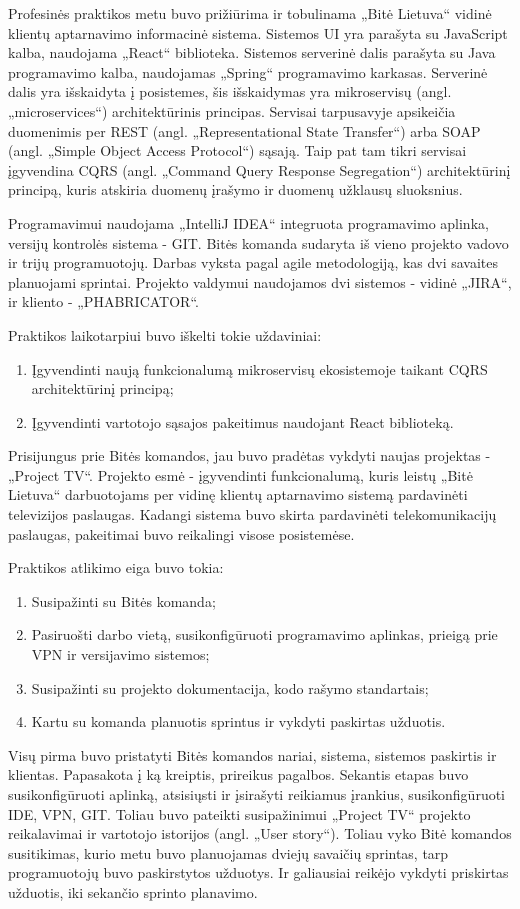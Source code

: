 Profesinės praktikos metu buvo prižiūrima ir tobulinama „Bitė Lietuva“ vidinė klientų aptarnavimo informacinė sistema. Sistemos UI yra parašyta su JavaScript kalba,
naudojama „React“ biblioteka. Sistemos serverinė dalis parašyta su Java programavimo kalba, naudojamas „Spring“ programavimo karkasas. Serverinė dalis yra išskaidyta į
posistemes, šis išskaidymas yra mikroservisų (angl. „microservices“) architektūrinis principas. Servisai tarpusavyje apsikeičia duomenimis per
REST (angl. „Representational State Transfer“) arba SOAP (angl. „Simple Object Access Protocol“) sąsają. Taip pat tam tikri servisai įgyvendina
CQRS (angl. „Command Query Response Segregation“) architektūrinį principą, kuris atskiria duomenų įrašymo ir duomenų užklausų sluoksnius.

Programavimui naudojama „IntelliJ IDEA“ integruota programavimo aplinka, versijų kontrolės sistema - GIT. Bitės komanda sudaryta iš vieno projekto vadovo ir trijų programuotojų.
Darbas vyksta pagal agile metodologiją, kas dvi savaites planuojami sprintai. Projekto valdymui naudojamos dvi sistemos - vidinė „JIRA“, ir kliento - „PHABRICATOR“.

\smallskip
Praktikos laikotarpiui buvo iškelti tokie uždaviniai:
\begin{enumerate}
    \item Įgyvendinti naują funkcionalumą mikroservisų ekosistemoje taikant CQRS architektūrinį principą;
    \item Įgyvendinti vartotojo sąsajos pakeitimus naudojant React biblioteką.
\end{enumerate}

\smallskip
Prisijungus prie Bitės komandos, jau buvo pradėtas vykdyti naujas projektas - „Project TV“. Projekto esmė - įgyvendinti funkcionalumą, kuris leistų „Bitė Lietuva“ darbuotojams
per vidinę klientų aptarnavimo sistemą pardavinėti televizijos paslaugas. Kadangi sistema buvo skirta pardavinėti telekomunikacijų paslaugas,
pakeitimai buvo reikalingi visose posistemėse.

\smallskip
Praktikos atlikimo eiga buvo tokia:
\begin{enumerate}
    \item Susipažinti su Bitės komanda;
    \item Pasiruošti darbo vietą, susikonfigūruoti programavimo aplinkas, prieigą prie VPN ir versijavimo sistemos;
    \item Susipažinti su projekto dokumentacija, kodo rašymo standartais;
    \item Kartu su komanda planuotis sprintus ir vykdyti paskirtas užduotis.
\end{enumerate}

\smallskip
Visų pirma buvo pristatyti Bitės komandos nariai, sistema, sistemos paskirtis ir klientas. Papasakota į ką kreiptis, prireikus pagalbos. Sekantis etapas buvo
susikonfigūruoti aplinką, atsisiųsti ir įsirašyti reikiamus įrankius, susikonfigūruoti IDE, VPN, GIT. Toliau buvo pateikti susipažinimui „Project TV“ projekto reikalavimai ir
vartotojo istorijos (angl. „User story“). Toliau vyko Bitė komandos susitikimas, kurio metu buvo planuojamas dviejų savaičių sprintas, tarp programuotojų buvo paskirstytos
užduotys. Ir galiausiai reikėjo vykdyti priskirtas užduotis, iki sekančio sprinto planavimo.